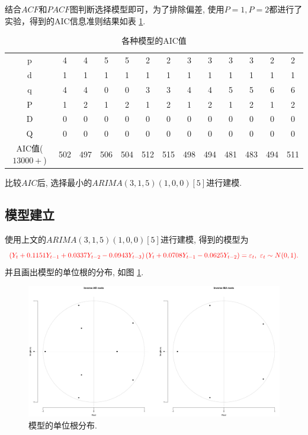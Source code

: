 \documentclass[11pt]{article}
\begin{document}
\qquad 结合$ACF$和$PACF$图判断选择模型即可，为了排除偏差, 使用$P=1,P=2$都进行了实验，得到的AIC信息准则结果如表 \ref{tab:my-table2}. 
\begin{table}[htbp]
    \centering
    \caption{各种模型的AIC值}
    \label{tab:my-table2}
    \begin{tabular}{c|cccccccccccc}
    \hline
    p & 4 & 4 & 5 & 5 & 2 & 2 & 3 & 3 & 3 & 3 & 2 & 2 \\
    d & 1 & 1 & 1 & 1 & 1 & 1 & 1 & 1 & 1 & 1 & 1 & 1 \\
    q & 4 & 4 & 0 & 0 & 3 & 3 & 4 & 4 & 5 & 5 & 6 & 6 \\
    P & 1 & 2 & 1 & 2 & 1 & 2 & 1 & 2 & 1 & 2 & 1 & 2 \\
    D & 0 & 0 & 0 & 0 & 0 & 0 & 0 & 0 & 0 & 0 & 0 & 0 \\
    Q & 0 & 0 & 0 & 0 & 0 & 0 & 0 & 0 & 0 & 0 & 0 & 0 \\ \hline
    AIC值($13000+$) & 502 & 497 & 506 & 504 & 512 & 515 & 498 & 494 & 481 & 483 & 494 & 511 \\ \hline
    \end{tabular}
\end{table}

比较$AIC$后, 选择最小的$ARIMA(3,1,5)(1,0,0)[5]$进行建模. 
\subsection{模型建立}
\qquad 使用上文的$ARIMA(3,1,5)(1,0,0)[5]$进行建模, 得到的模型为
\[
    \textcolor{red}{\left(Y_t+0.1151 Y_{t-1}+ 0.0337Y_{t-2}-0.0943 Y_{t-3}\right)\left(Y_t+0.0708Y_{t-1}-0.0625Y_{t-2}\right)=\varepsilon_t,\ \varepsilon_t\sim N(0,1).}
\]
并且画出模型的单位根的分布, 如图 \ref{fig:m1r}.
\begin{figure}[htbp]
    \centering
    \includegraphics[width=.85\textwidth]{m1}
    \caption{模型的单位根分布. \label{fig:m1r}}
\end{figure}
\end{document}

